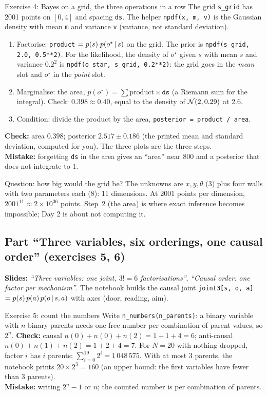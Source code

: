 \documentclass[11pt]{article}
\newcommand{\slide}[1]{\textit{``#1''}}
\begin{document}
\begin{labhelp}{Exercise 4: Bayes on a grid, the three operations in a row}
The grid \texttt{s\_grid} has 2001 points on $[0,4]$ and spacing \texttt{ds}. The helper \texttt{npdf(x, m, v)} is the Gaussian density with mean \texttt{m} and variance \texttt{v} (variance, not standard deviation).
\begin{enumerate}[nosep]
\item Factorise: \texttt{product} $=p(s)\;p(o^\star\,|\, s)$ on the grid. The prior is \texttt{npdf(s\_grid, 2.0, 0.5**2)}. For the likelihood, the density of $o^\star$ given $s$ with mean $s$ and variance $0.2^2$ is \texttt{npdf(o\_star, s\_grid, 0.2**2)}: the grid goes in the \emph{mean} slot and $o^\star$ in the \emph{point} slot.
\item Marginalise: the area, $p(o^\star)=\sum\text{product}\times\texttt{ds}$ (a Riemann sum for the integral). Check: $0.398\approx0.40$, equal to the density of $\mathcal{N}(2,0.29)$ at 2.6.
\item Condition: divide the product by the area, \texttt{posterior = product / area}.
\end{enumerate}
\textbf{Check:} area $0.398$; posterior $2.517\pm0.186$ (the printed mean and standard deviation, computed for you). The three plots are the three steps.\\
\textbf{Mistake:} forgetting \texttt{ds} in the area gives an ``area'' near $800$ and a posterior that does not integrate to 1.
\end{labhelp}

\begin{labhelp}{Question: how big would the grid be?}
The unknowns are $x,y,\theta$ (3) plus four walls with two parameters each (8): 11 dimensions. At 2001 points per dimension, $2001^{11}\approx2\times10^{36}$ points. Step~2 (the area) is where exact inference becomes impossible; Day 2 is about not computing it.
\end{labhelp}

\subsection*{Part ``Three variables, six orderings, one causal order'' (exercises 5, 6)}
\textbf{Slides:} \slide{Three variables: one joint, $3!=6$ factorisations}, \slide{Causal order: one factor per mechanism}. The notebook builds the causal joint \texttt{joint3[s, o, a]} $=p(s)\,p(a)\,p(o\,|\, s,a)$ with axes (door, reading, aim).

\begin{labhelp}{Exercise 5: count the numbers}
Write \texttt{n\_numbers(n\_parents)}: a binary variable with $n$ binary parents needs one free number per combination of parent values, so $2^{n}$.
\textbf{Check:} causal $n(0)+n(0)+n(2)=1+1+4=6$; anti-causal $n(0)+n(1)+n(2)=1+2+4=7$. For $N=20$ with nothing dropped, factor $i$ has $i$ parents: $\sum_{i=0}^{19}2^i=1\,048\,575$. With at most 3 parents, the notebook prints $20\times2^3=160$ (an upper bound: the first variables have fewer than 3 parents).\\
\textbf{Mistake:} writing $2^{n}-1$ or $n$; the counted number is per combination of parents.
\end{labhelp}
\end{document}
